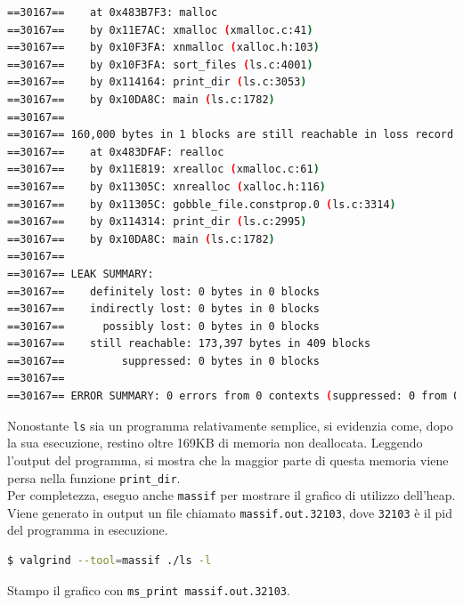 \documentclass{article}
\begin{document}
\begin{lstlisting}[language=bash]
==30167==    at 0x483B7F3: malloc 
==30167==    by 0x11E7AC: xmalloc (xmalloc.c:41)
==30167==    by 0x10F3FA: xnmalloc (xalloc.h:103)
==30167==    by 0x10F3FA: sort_files (ls.c:4001)
==30167==    by 0x114164: print_dir (ls.c:3053)
==30167==    by 0x10DA8C: main (ls.c:1782)
==30167== 
==30167== 160,000 bytes in 1 blocks are still reachable in loss record 8 of 8
==30167==    at 0x483DFAF: realloc 
==30167==    by 0x11E819: xrealloc (xmalloc.c:61)
==30167==    by 0x11305C: xnrealloc (xalloc.h:116)
==30167==    by 0x11305C: gobble_file.constprop.0 (ls.c:3314)
==30167==    by 0x114314: print_dir (ls.c:2995)
==30167==    by 0x10DA8C: main (ls.c:1782)
==30167== 
==30167== LEAK SUMMARY:
==30167==    definitely lost: 0 bytes in 0 blocks
==30167==    indirectly lost: 0 bytes in 0 blocks
==30167==      possibly lost: 0 bytes in 0 blocks
==30167==    still reachable: 173,397 bytes in 409 blocks
==30167==         suppressed: 0 bytes in 0 blocks
==30167== 
==30167== ERROR SUMMARY: 0 errors from 0 contexts (suppressed: 0 from 0)
\end{lstlisting}

Nonostante \texttt{ls} sia un programma relativamente semplice, si evidenzia
come, dopo la sua esecuzione, restino oltre 169KB di memoria non deallocata.
Leggendo l'output del programma, si mostra che la maggior parte di questa
memoria viene persa nella funzione \texttt{print\_dir}. \\

Per completezza, eseguo anche \texttt{massif} per mostrare il grafico di
utilizzo dell'heap. Viene generato in output un file chiamato
\texttt{massif.out.32103}, dove \texttt{32103} è il pid del programma in
esecuzione.

\begin{lstlisting}[language=bash]
$ valgrind --tool=massif ./ls -l
\end{lstlisting}

Stampo il grafico con \texttt{ms\_print massif.out.32103}.
\end{document}
